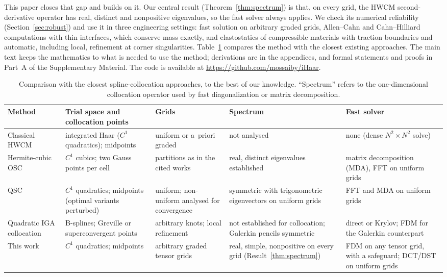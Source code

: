 \documentclass[preprint,12pt]{elsarticle}
\theoremstyle{remark}
\newcommand{\repo}{\url{https://github.com/mossaiby/iHaar}}
\begin{document}
This paper closes that gap and builds on it. Our central result (Theorem~\ref{thm:spectrum}) is that, on
every grid, the HWCM second-derivative operator has real, distinct and nonpositive eigenvalues, so the
fast solver always applies. We check its numerical reliability (Section~\ref{sec:robust}) and use it in
three engineering settings: fast solution on arbitrary graded grids, Allen--Cahn and Cahn--Hilliard
computations with thin interfaces, which conserve mass exactly, and elastostatics of compressible
materials with traction boundaries and automatic, including local, refinement at corner singularities.
Table~\ref{tab:closest} compares the method with the closest existing approaches. The main text keeps
the mathematics to what is needed to use the method; derivations are in the appendices, and formal
statements and proofs in Part~A of the Supplementary Material. The code is available at \repo.

\begin{table}[t]\centering\footnotesize
\caption{Comparison with the closest spline-collocation approaches, to the best of our knowledge. ``Spectrum'' refers to the one-dimensional collocation operator used by fast diagonalization or matrix decomposition.}\label{tab:closest}
\begin{tabular}{p{}p{}p{}p{}p{}}
\toprule
Method & Trial space and collocation points & Grids & Spectrum & Fast solver\\
\midrule
Classical HWCM~\cite{lepik2011solving,oruc2019nonuniform} & integrated Haar ($C^1$ quadratics); midpoints & uniform or a~priori graded & not analysed & none (dense $N^2\times N^2$ solve)\\\addlinespace
Hermite-cubic OSC~\cite{dyksen1987tensor,sun1999spectral,bialecki1995matrix} & $C^1$ cubics; two Gauss points per cell & partitions as in the cited works & real, distinct eigenvalues established & matrix decomposition (MDA), FFT on uniform grids\\\addlinespace
QSC~\cite{houstis1988quadratic,christara2002fast,christara2006optimal} & $C^1$ quadratics; midpoints (optimal variants perturbed) & uniform; non-uniform analysed for convergence & symmetric with trigonometric eigenvectors on uniform grids & FFT and MDA on uniform grids\\\addlinespace
Quadratic IGA collocation~\cite{auricchio2010isogeometric,schillinger2013isogeometric,delorenzis2015isogeometric} & B-splines; Greville or superconvergent points & arbitrary knots; local refinement & not established for collocation; Galerkin pencils symmetric~\cite{sangalli2016isogeometric} & direct or Krylov; FDM for the Galerkin counterpart\\\addlinespace
This work & $C^1$ quadratics; midpoints & arbitrary graded tensor grids & real, simple, nonpositive on every grid (Result~\ref{thm:spectrum}) & FDM on any tensor grid, with a safeguard; DCT/DST on uniform grids\\
\bottomrule
\end{tabular}
\end{table}
\end{document}
